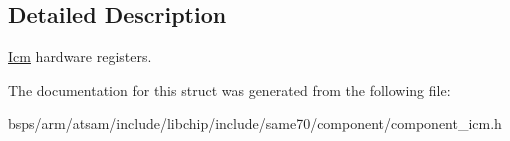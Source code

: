 \subsection{Detailed Description}
\mbox{\hyperlink{structIcm}{Icm}} hardware registers. 

The documentation for this struct was generated from the following file\+:\begin{DoxyCompactItemize}
\item 
bsps/arm/atsam/include/libchip/include/same70/component/component\+\_\+icm.\+h\end{DoxyCompactItemize}
